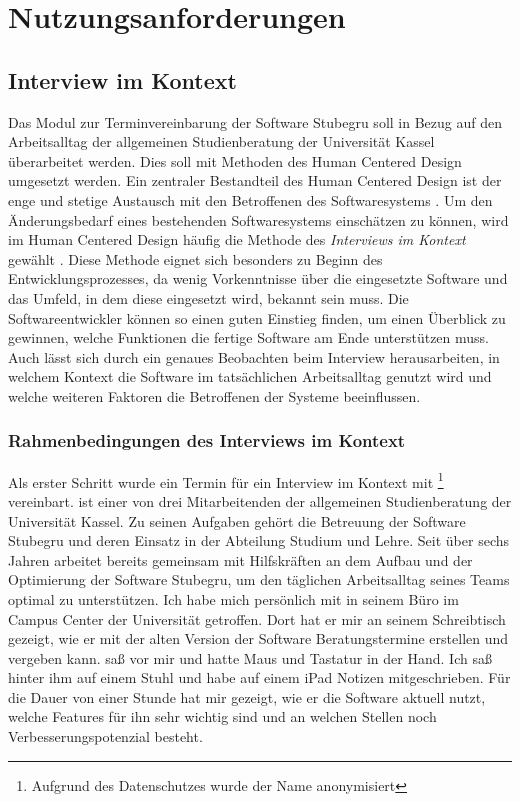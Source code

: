 \chapter{Nutzungsanforderungen}
\label{chapter:user-requirements}

\section{Interview im Kontext}
\label{subsection:IIK}

Das Modul zur Terminvereinbarung der Software Stubegru soll in Bezug auf den
Arbeitsalltag der allgemeinen Studienberatung der Universität Kassel
überarbeitet werden. Dies soll mit Methoden des Human Centered Design umgesetzt
werden. Ein zentraler Bestandteil des Human Centered Design ist der enge und
stetige Austausch mit den Betroffenen des Softwaresystems \cite{hci}. Um den
Änderungsbedarf eines bestehenden Softwaresystems einschätzen zu können, wird im
Human Centered Design häufig die Methode des \textit{Interviews im Kontext}
gewählt \cite{contextualDesign}. Diese Methode eignet sich besonders zu Beginn
des Entwicklungsprozesses, da wenig Vorkenntnisse über die eingesetzte Software
und das Umfeld, in dem diese eingesetzt wird, bekannt sein muss. Die
Softwareentwickler können so einen guten Einstieg finden, um einen Überblick zu
gewinnen, welche Funktionen die fertige Software am Ende unterstützen muss.
Auch lässt sich durch ein genaues Beobachten beim Interview herausarbeiten, in
welchem Kontext die Software im tatsächlichen Arbeitsalltag genutzt wird und
welche weiteren Faktoren die Betroffenen der Systeme beeinflussen.

\subsection*{Rahmenbedingungen des Interviews im Kontext}
Als erster Schritt wurde ein Termin für ein Interview im Kontext mit
\ipName\footnote{Aufgrund des Datenschutzes wurde der Name anonymisiert}
vereinbart. \ipName ist einer von drei Mitarbeitenden der allgemeinen
Studienberatung der Universität Kassel. Zu seinen Aufgaben gehört die Betreuung
der Software Stubegru und deren Einsatz in der Abteilung Studium und Lehre.
Seit über sechs Jahren arbeitet \ipName bereits gemeinsam mit Hilfskräften an
dem Aufbau und der Optimierung der Software Stubegru, um den täglichen
Arbeitsalltag seines Teams optimal zu unterstützen. Ich habe mich persönlich
mit \ipName in seinem Büro im Campus Center der Universität getroffen. Dort hat
er mir an seinem Schreibtisch gezeigt, wie er mit der alten Version der
Software Beratungstermine erstellen und vergeben kann. \ipName saß vor mir und
hatte Maus und Tastatur in der Hand. Ich saß hinter ihm auf einem Stuhl und
habe auf einem iPad Notizen mitgeschrieben. Für die Dauer von einer Stunde hat
\ipName mir gezeigt, wie er die Software aktuell nutzt, welche Features für ihn
sehr wichtig sind und an welchen Stellen noch Verbesserungspotenzial besteht.

